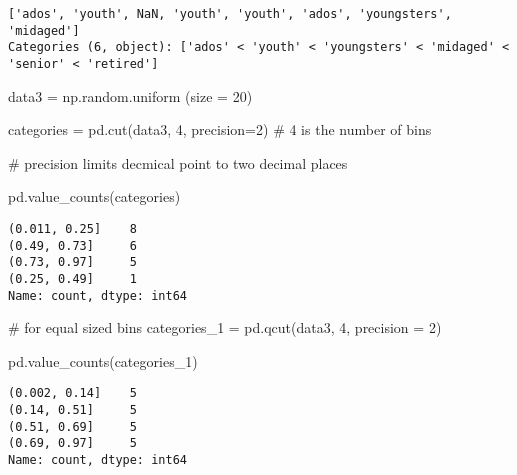 \documentclass[
  letterpaper,
  DIV=11,
  numbers=noendperiod]{scrreprt}
\newenvironment{Shaded}{\begin{snugshade}}{\end{snugshade}}
\newcommand{\CommentTok}[1]{\textcolor[rgb]{0.37,0.37,0.37}{#1}}
\newcommand{\DecValTok}[1]{\textcolor[rgb]{0.68,0.00,0.00}{#1}}
\newcommand{\NormalTok}[1]{\textcolor[rgb]{0.00,0.23,0.31}{#1}}
\newcommand{\OperatorTok}[1]{\textcolor[rgb]{0.37,0.37,0.37}{#1}}
\begin{document}
\begin{verbatim}
['ados', 'youth', NaN, 'youth', 'youth', 'ados', 'youngsters', 'midaged']
Categories (6, object): ['ados' < 'youth' < 'youngsters' < 'midaged' < 'senior' < 'retired']
\end{verbatim}

\begin{Shaded}
\begin{Highlighting}[]
\NormalTok{data3 }\OperatorTok{=}\NormalTok{ np.random.uniform (size }\OperatorTok{=} \DecValTok{20}\NormalTok{)}

\NormalTok{categories }\OperatorTok{=}\NormalTok{ pd.cut(data3, }\DecValTok{4}\NormalTok{, precision}\OperatorTok{=}\DecValTok{2}\NormalTok{)   }\CommentTok{\# 4 is the number of bins}

\CommentTok{\# precision limits decmical point to two decimal places}
\end{Highlighting}
\end{Shaded}

\begin{Shaded}
\begin{Highlighting}[]
\NormalTok{pd.value\_counts(categories)}
\end{Highlighting}
\end{Shaded}

\begin{verbatim}
(0.011, 0.25]    8
(0.49, 0.73]     6
(0.73, 0.97]     5
(0.25, 0.49]     1
Name: count, dtype: int64
\end{verbatim}

\begin{Shaded}
\begin{Highlighting}[]
\CommentTok{\# for equal sized bins}
\NormalTok{categories\_1 }\OperatorTok{=}\NormalTok{ pd.qcut(data3, }\DecValTok{4}\NormalTok{, precision }\OperatorTok{=} \DecValTok{2}\NormalTok{)}
\end{Highlighting}
\end{Shaded}

\begin{Shaded}
\begin{Highlighting}[]
\NormalTok{pd.value\_counts(categories\_1)}
\end{Highlighting}
\end{Shaded}

\begin{verbatim}
(0.002, 0.14]    5
(0.14, 0.51]     5
(0.51, 0.69]     5
(0.69, 0.97]     5
Name: count, dtype: int64
\end{verbatim}
\end{document}
